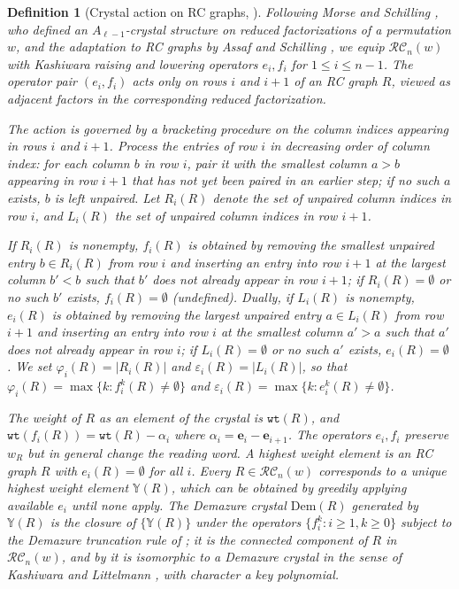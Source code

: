 \documentclass[pdflatex,sn-mathphys-num]{sn-jnl}
\numberwithin{equation}{subsection}
\newcommand{\wof}[1]{w_{#1}}
\newcommand{\wtt}{\mathtt{wt}}
\newcommand{\RC}{\mathcal{RC}}
\theoremstyle{thmstyleone}
\theoremstyle{thmstylethree}
\newtheorem{definition}[lemma]{Definition}
\theoremstyle{thmstyletwo}
\begin{document}
\begin{definition}[Crystal action on RC graphs, {\cite[Definition~\ref*{B-definition:crystal}]{samuelbialgebra}}] \label{definition:crystal}
Following Morse and Schilling \cite{morse2016crystal}, who defined an $A_{\ell-1}$-crystal structure on reduced factorizations of a permutation $w$, and the adaptation to RC graphs by Assaf and Schilling \cite{assaf2018demazure}, we equip $\RC_n(w)$ with Kashiwara raising and lowering operators $e_i, f_i$ for $1\leq i\leq n-1$. The operator pair $(e_i, f_i)$ acts only on rows $i$ and $i+1$ of an RC graph $R$, viewed as adjacent factors in the corresponding reduced factorization.

The action is governed by a bracketing procedure on the column indices appearing in rows $i$ and $i+1$. Process the entries of row $i$ in decreasing order of column index: for each column $b$ in row $i$, pair it with the smallest column $a>b$ appearing in row $i+1$ that has not yet been paired in an earlier step; if no such $a$ exists, $b$ is left unpaired. Let $R_i(R)$ denote the set of unpaired column indices in row $i$, and $L_i(R)$ the set of unpaired column indices in row $i+1$.

If $R_i(R)$ is nonempty, $f_i(R)$ is obtained by removing the smallest unpaired entry $b\in R_i(R)$ from row $i$ and inserting an entry into row $i+1$ at the largest column $b' < b$ such that $b'$ does not already appear in row $i+1$; if $R_i(R) = \emptyset$ or no such $b'$ exists, $f_i(R) = \emptyset$ (undefined). Dually, if $L_i(R)$ is nonempty, $e_i(R)$ is obtained by removing the largest unpaired entry $a\in L_i(R)$ from row $i+1$ and inserting an entry into row $i$ at the smallest column $a' > a$ such that $a'$ does not already appear in row $i$; if $L_i(R) = \emptyset$ or no such $a'$ exists, $e_i(R) = \emptyset$. We set $\varphi_i(R)=|R_i(R)|$ and $\varepsilon_i(R)=|L_i(R)|$, so that $\varphi_i(R)=\max\{k: f_i^k(R)\neq\emptyset\}$ and $\varepsilon_i(R)=\max\{k:e_i^k(R)\neq\emptyset\}$.

The \emph{weight} of $R$ as an element of the crystal is $\wtt(R)$, and $\wtt(f_i(R))=\wtt(R)-\alpha_i$ where $\alpha_i=\mathbf{e}_i-\mathbf{e}_{i+1}$. The operators $e_i,f_i$ preserve $\wof{R}$ but in general change the reading word. A \emph{highest weight} element is an RC graph $R$ with $e_i(R) = \emptyset$ for all $i$. Every $R\in \RC_n(w)$ corresponds to a unique highest weight element $\mathbb{Y}(R)$, which can be obtained by greedily applying available $e_i$ until none apply. The \emph{Demazure crystal} $\mathrm{Dem}(R)$ generated by $\mathbb{Y}(R)$ is the closure of $\{\mathbb{Y}(R)\}$ under the operators $\{f_i^k : i\geq 1, k\geq 0\}$ subject to the Demazure truncation rule of \cite{assaf2018demazure}; it is the connected component of $R$ in $\RC_n(w)$, and by \cite{assaf2018demazure} it is isomorphic to a Demazure crystal in the sense of Kashiwara \cite{kashiwara1993crystal} and Littelmann \cite{littelmann1995crystal}, with character a key polynomial.
\end{definition}
\end{document}
